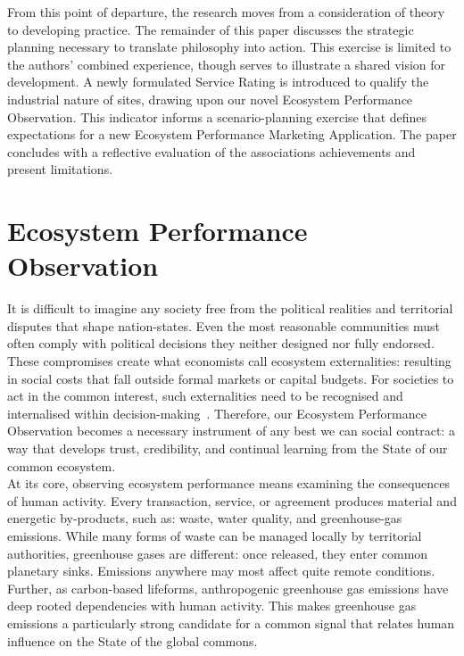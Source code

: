 \documentclass[12pt, oneside]{article}   	%
\begin{document}
From this point of departure, the research moves from a consideration of theory to developing practice.
The remainder of this paper discusses the strategic planning necessary to translate philosophy into action.
This exercise is limited to the authors’ combined experience, though serves to illustrate a shared vision for development.
A newly formulated Service Rating is introduced to qualify the industrial nature of sites, drawing upon our novel Ecosystem Performance Observation.
This indicator informs a scenario-planning exercise that defines expectations for a new Ecosystem Performance Marketing Application.
The paper concludes with a reflective evaluation of the associations achievements and present limitations.\\

\section{Ecosystem Performance Observation}

It is difficult to imagine any society free from the political realities and territorial disputes that shape nation-states.
Even the most reasonable communities must often comply with political decisions they neither designed nor fully endorsed.
These compromises create what economists call ecosystem externalities: resulting in social costs that fall outside formal markets or capital budgets.
For societies to act in the common interest, such externalities need to be recognised and internalised within decision-making~\cite{rc1}.
Therefore, our Ecosystem Performance Observation becomes a necessary instrument of any best we can social contract: a way that develops trust, credibility, and continual learning from the State of our common ecosystem.\\

At its core, observing ecosystem performance means examining the consequences of human activity.
Every transaction, service, or agreement produces material and energetic by-products, such as: waste, water quality, and greenhouse-gas emissions.
While many forms of waste can be managed locally by territorial authorities, greenhouse gases are different: once released, they enter common planetary sinks.
Emissions anywhere may most affect quite remote conditions.
Further, as carbon-based lifeforms, anthropogenic greenhouse gas emissions have deep rooted dependencies with human activity.
This makes greenhouse gas emissions a particularly strong candidate for a common signal that relates human influence on the State of the global commons.\\
\end{document}

